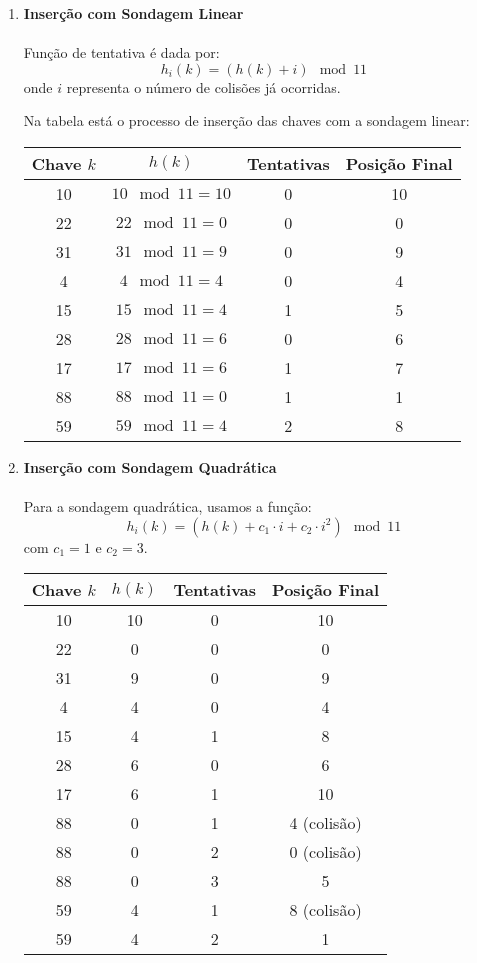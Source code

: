 \documentclass{article}
\begin{document}
\begin{enumerate}[label=\alph*)]
  \item \textbf{Inserção com Sondagem Linear}
  \\\\
    Função de tentativa é dada por:
    \[
    h_i(k) = (h(k) + i) \mod 11
    \]
    onde \(i\) representa o número de colisões já ocorridas.

    Na tabela está o processo de inserção das chaves com a sondagem linear:

    \begin{center}
    \begin{tabular}{|c|c|c|c|}
    \hline
    Chave \(k\) & \(h(k)\) & Tentativas & Posição Final \\
    \hline
    10 & \(10 \mod 11 = 10\) & 0 & 10 \\
    22 & \(22 \mod 11 = 0\) & 0 & 0 \\
    31 & \(31 \mod 11 = 9\) & 0 & 9 \\
    4 & \(4 \mod 11 = 4\) & 0 & 4 \\
    15 & \(15 \mod 11 = 4\) & 1 & 5 \\
    28 & \(28 \mod 11 = 6\) & 0 & 6 \\
    17 & \(17 \mod 11 = 6\) & 1 & 7 \\
    88 & \(88 \mod 11 = 0\) & 1 & 1 \\
    59 & \(59 \mod 11 = 4\) & 2 & 8 \\
    \hline
    \end{tabular}
    \end{center}

  \item \textbf{Inserção com Sondagem Quadrática}
  \\\\
  Para a sondagem quadrática, usamos a função:
  \[
  h_i(k) = (h(k) + c_1 \cdot i + c_2 \cdot i^2) \mod 11
  \]
  com \(c_1 = 1\) e \(c_2 = 3\).
  
  \begin{center}
  \begin{tabular}{|c|c|c|c|}
  \hline
  Chave \(k\) & \(h(k)\) & Tentativas & Posição Final \\
  \hline
  10 & 10 & 0 & 10 \\
  22 & 0 & 0 & 0 \\
  31 & 9 & 0 & 9 \\
  4 & 4 & 0 & 4 \\
  15 & 4 & 1 & 8 \\
  28 & 6 & 0 & 6 \\
  17 & 6 & 1 & 10 \\
  88 & 0 & 1 & 4 (colisão) \\
  88 & 0 & 2 & 0 (colisão) \\
  88 & 0 & 3 & 5 \\
  59 & 4 & 1 & 8 (colisão) \\
  59 & 4 & 2 & 1 \\
  \hline
  \end{tabular}
  \end{center}
  

\end{enumerate}
\end{document}
